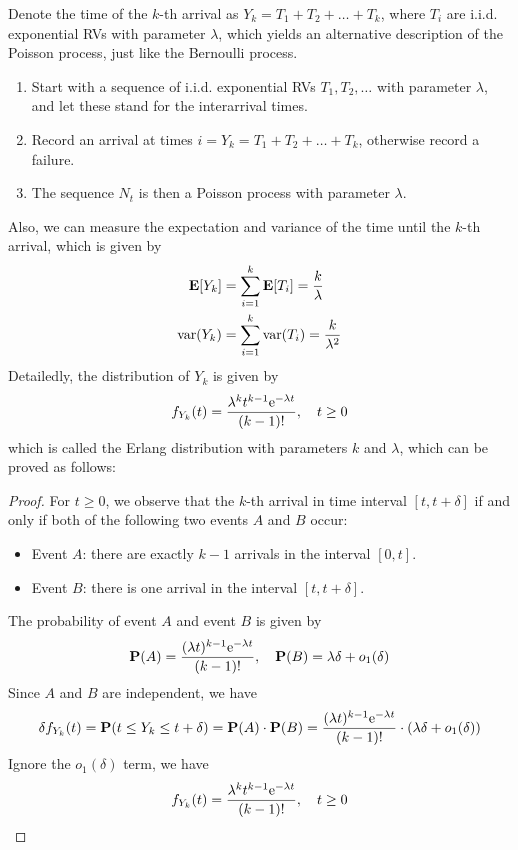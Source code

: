 \documentclass[device=normal, lang=en]{elegantbook}
\numberwithin{equation}{section}
\begin{document}
Denote the time of the $k$-th arrival as $Y_k = T_1 + T_2 + \ldots + T_k$, where $T_i$ are i.i.d. exponential RVs with parameter $\lambda$, which yields an alternative description of the Poisson process, just like the Bernoulli process.
\begin{definition}
    \begin{enumerate}
        \item Start with a sequence of i.i.d. exponential RVs $T_1, T_2, \ldots$ with parameter $\lambda$, and let these stand for the interarrival times.
        \item Record an arrival at times $i = Y_k = T_1 + T_2 + \ldots + T_k$, otherwise record a failure.
        \item The sequence $N_t$ is then a Poisson process with parameter $\lambda$.
    \end{enumerate}
\end{definition}
Also, we can measure the expectation and variance of the time until the $k$-th arrival, which is given by
\begin{align}
    \mathbf{E}\qty[Y_k] &= \sum_{i=1}^{k} \mathbf{E}\qty[T_i] = \frac{k}{\lambda} \\
    \mathrm{var}\qty(Y_k) &= \sum_{i=1}^{k} \mathrm{var}\qty(T_i) = \frac{k}{\lambda^2}
\end{align}
Detailedly, the distribution of $Y_k$ is given by
\begin{equation}
    f_{Y_k}(t) = \frac{\lambda^k t^{k-1} \mathrm{e}^{-\lambda t}}{(k-1)!}, \quad t \geq 0
\end{equation}
which is called the Erlang distribution with parameters $k$ and $\lambda$, which can be proved as follows:
\begin{proof}
    For $t \geq 0$, we observe that the $k$-th arrival in time interval $[t, t + \delta]$ if and only if both of the following two events $A$ and $B$ occur:
    \begin{itemize}
        \item Event $A$: there are exactly $k-1$ arrivals in the interval $[0, t]$.
        \item Event $B$: there is one arrival in the interval $[t, t + \delta]$.
    \end{itemize}
    The probability of event $A$ and event $B$ is given by
    \begin{equation}
        \mathbf{P}(A) = \frac{(\lambda t)^{k-1} \mathrm{e}^{-\lambda t}}{(k-1)!}, \quad \mathbf{P}(B) = \lambda \delta + o_1(\delta)
    \end{equation}
    Since $A$ and $B$ are independent, we have
    \begin{equation}
        \delta f_{Y_k}(t) = \mathbf{P}(t \leq Y_k \leq t + \delta) = \mathbf{P}(A) \cdot \mathbf{P}(B) = \frac{(\lambda t)^{k-1} \mathrm{e}^{-\lambda t}}{(k-1)!} \cdot (\lambda \delta + o_1(\delta))
    \end{equation}
    Ignore the $o_1(\delta)$ term, we have
    \begin{equation}
        f_{Y_k}(t) = \frac{\lambda^k t^{k-1} \mathrm{e}^{-\lambda t}}{(k-1)!}, \quad t \geq 0
    \end{equation}
\end{proof}
\end{document}
